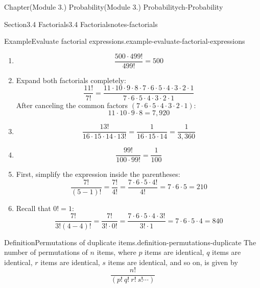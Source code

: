 \documentclass[oneside,10pt,]{book}
\begin{document}
\begin{chapterptx}{Chapter}{(Module 3.) Probability}{}{(Module 3.) Probability}{}{}{ch-Probability}
\begin{sectionptx}{Section}{3.4 Factorials}{}{3.4 Factorials}{}{}{notes-factorials}
\begin{example}{Example}{Evaluate factorial expressions.}{example-evaluate-factorial-expressions}
\begin{enumerate}
\begin{equation*}
\frac{21!}{24 \cdot 23 \cdot 22 \cdot 21!} = \frac{1}{24 \cdot 23 \cdot 22} = \frac{1}{12,144}
\end{equation*}
%
\item{}%
\begin{equation*}
\frac{500 \cdot 499!}{499!} = 500
\end{equation*}
%
\item{}Expand both factorials completely:%
\begin{equation*}
\frac{11!}{7!} = \frac{11 \cdot 10 \cdot 9 \cdot 8 \cdot 7 \cdot 6 \cdot 5 \cdot 4 \cdot 3 \cdot 2 \cdot 1}{7 \cdot 6 \cdot 5 \cdot 4 \cdot 3 \cdot 2 \cdot 1}
\end{equation*}
After canceling the common factors \((7 \cdot 6 \cdot 5 \cdot 4 \cdot 3 \cdot 2 \cdot 1)\):%
\begin{equation*}
11 \cdot 10 \cdot 9 \cdot 8 = 7,920
\end{equation*}
%
\item{}%
\begin{equation*}
\frac{13!}{16 \cdot 15 \cdot 14 \cdot 13!} = \frac{1}{16 \cdot 15 \cdot 14} = \frac{1}{3,360}
\end{equation*}
%
\item{}%
\begin{equation*}
\frac{99!}{100 \cdot 99!} = \frac{1}{100}
\end{equation*}
%
\item{}First, simplify the expression inside the parentheses:%
\begin{equation*}
\frac{7!}{(5-1)!} = \frac{7!}{4!} = \frac{7 \cdot 6 \cdot 5 \cdot 4!}{4!} = 7 \cdot 6 \cdot 5 = 210
\end{equation*}
%
\item{}Recall that \(0! = 1\):%
\begin{equation*}
\frac{7!}{3!(4-4)!} = \frac{7!}{3! \cdot 0!} = \frac{7 \cdot 6 \cdot 5 \cdot 4 \cdot 3!}{3! \cdot 1} = 7 \cdot 6 \cdot 5 \cdot 4 = 840
\end{equation*}
%
\end{enumerate}
\end{example}
\begin{definition}{Definition}{Permutations of duplicate items.}{definition-permutations-duplicate}%
The number of permutations of \(n\) items, where \(p\) items are identical, \(q\) items are identical, \(r\) items are identical, \(s\) items are identical, and so on, is given by%
%
\begin{equation*}
\displaystyle \frac{n!}{(p!\ q!\ r!\ s!\cdots)}

\end{equation*}
\end{definition}
\end{sectionptx}
\end{chapterptx}
\end{document}
